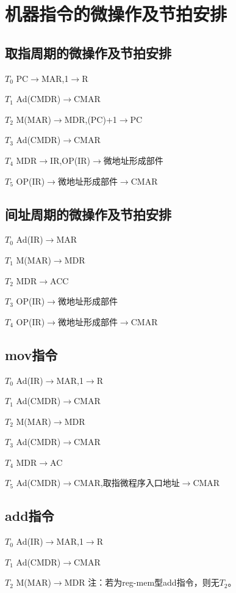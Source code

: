 \documentclass[UTF8]{ctexrep}
\begin{document}
\section{机器指令的微操作及节拍安排}

\subsection{取指周期的微操作及节拍安排}

\(T_{0}\) PC$\to$MAR,1$\to$R

\(T_{1}\) Ad(CMDR)$\to$CMAR

\(T_{2}\) M(MAR)$\to$MDR,(PC)+1$\to$PC

\(T_{3}\) Ad(CMDR)$\to$CMAR

\(T_{4}\) MDR$\to$IR,OP(IR)$\to$微地址形成部件

\(T_{5}\) OP(IR)$\to$微地址形成部件$\to$CMAR

\subsection{间址周期的微操作及节拍安排}

\(T_{0}\) Ad(IR)$\to$MAR

\(T_{1}\) M(MAR)$\to$MDR

\(T_{2}\) MDR$\to$ACC

\(T_{3}\) OP(IR)$\to$微地址形成部件

\(T_{4}\) OP(IR)$\to$微地址形成部件$\to$CMAR

\subsection{mov指令}

\(T_{0}\) Ad(IR)$\to$MAR,1$\to$R

\(T_{1}\) Ad(CMDR)$\to$CMAR

\(T_{2}\) M(MAR)$\to$MDR

\(T_{3}\) Ad(CMDR)$\to$CMAR

\(T_{4}\) MDR$\to$AC

\(T_{5}\) Ad(CMDR)$\to$CMAR,取指微程序入口地址$\to$CMAR


\subsection{add指令}

\(T_{0}\) Ad(IR)$\to$MAR,1$\to$R

\(T_{1}\) Ad(CMDR)$\to$CMAR

\(T_{2}\) M(MAR)$\to$MDR
注：若为reg-mem型add指令，则无\(T_{2}\)。
\end{document}
